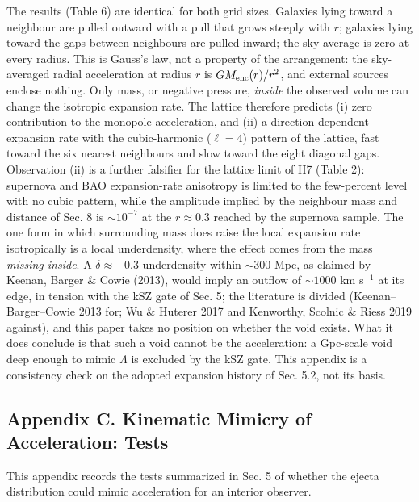 \documentclass[
]{article}
\begin{document}
The results (Table 6) are identical for both grid sizes. Galaxies lying
toward a neighbour are pulled outward with a pull that grows steeply
with \(r\); galaxies lying toward the gaps between neighbours are pulled
inward; the sky average is zero at every radius. This is Gauss's law,
not a property of the arrangement: the sky-averaged radial acceleration
at radius \(r\) is \(G M_{\rm enc}(r)/r^2\), and external sources
enclose nothing. Only mass, or negative pressure, \emph{inside} the
observed volume can change the isotropic expansion rate. The lattice
therefore predicts (i) zero contribution to the monopole acceleration,
and (ii) a direction-dependent expansion rate with the cubic-harmonic
(\(\ell = 4\)) pattern of the lattice, fast toward the six nearest
neighbours and slow toward the eight diagonal gaps. Observation (ii) is
a further falsifier for the lattice limit of H7 (Table 2): supernova and
BAO expansion-rate anisotropy is limited to the few-percent level with
no cubic pattern, while the amplitude implied by the neighbour mass and
distance of Sec. 8 is \(\sim\!10^{-7}\) at the \(r \approx 0.3\) reached
by the supernova sample. The one form in which surrounding mass does
raise the local expansion rate isotropically is a local underdensity,
where the effect comes from the mass \emph{missing inside}. A
\(\delta \approx -0.3\) underdensity within \(\sim\!300\) Mpc, as
claimed by Keenan, Barger \& Cowie (2013), would imply an outflow of
\(\sim\!1000\) km s\(^{-1}\) at its edge, in tension with the kSZ gate
of Sec. 5; the literature is divided (Keenan--Barger--Cowie 2013 for; Wu
\& Huterer 2017 and Kenworthy, Scolnic \& Riess 2019 against), and this
paper takes no position on whether the void exists. What it does
conclude is that such a void cannot be the acceleration: a Gpc-scale
void deep enough to mimic \(\Lambda\) is excluded by the kSZ gate. This
appendix is a consistency check on the adopted expansion history of Sec.
5.2, not its basis.

\hypertarget{appendix-c.-kinematic-mimicry-of-acceleration-tests}{%
\subsection{\texorpdfstring{\textbf{Appendix C. Kinematic Mimicry of
Acceleration:
Tests}}{Appendix C. Kinematic Mimicry of Acceleration: Tests}}\label{appendix-c.-kinematic-mimicry-of-acceleration-tests}}

This appendix records the tests summarized in Sec. 5 of whether the
ejecta distribution could mimic acceleration for an interior observer.
\end{document}
